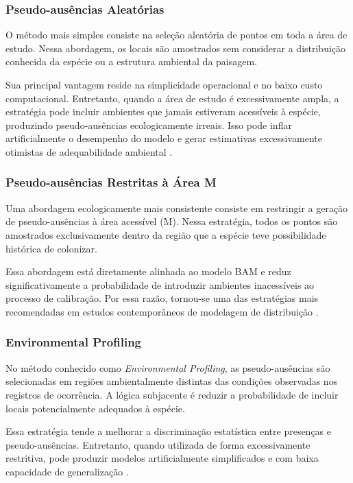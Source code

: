 \subsubsection{Pseudo-ausências Aleatórias}

O método mais simples consiste na seleção aleatória de pontos em toda a área de estudo. Nessa abordagem, os locais são amostrados sem considerar a distribuição conhecida da espécie ou a estrutura ambiental da paisagem.

Sua principal vantagem reside na simplicidade operacional e no baixo custo computacional. Entretanto, quando a área de estudo é excessivamente ampla, a estratégia pode incluir ambientes que jamais estiveram acessíveis à espécie, produzindo pseudo-ausências ecologicamente irreais. Isso pode inflar artificialmente o desempenho do modelo e gerar estimativas excessivamente otimistas de adequabilidade ambiental \citep{barve2011crucial}.

\subsubsection{Pseudo-ausências Restritas à Área M}

Uma abordagem ecologicamente mais consistente consiste em restringir a geração de pseudo-ausências à área acessível (M). Nessa estratégia, todos os pontos são amostrados exclusivamente dentro da região que a espécie teve possibilidade histórica de colonizar.

Essa abordagem está diretamente alinhada ao modelo BAM e reduz significativamente a probabilidade de introduzir ambientes inacessíveis ao processo de calibração. Por essa razão, tornou-se uma das estratégias mais recomendadas em estudos contemporâneos de modelagem de distribuição \citep{soberon2007grinnellian,barve2011crucial}.

\subsubsection{Environmental Profiling}

No método conhecido como \textit{Environmental Profiling}, as pseudo-ausências são selecionadas em regiões ambientalmente distintas das condições observadas nos registros de ocorrência. A lógica subjacente é reduzir a probabilidade de incluir locais potencialmente adequados à espécie.

Essa estratégia tende a melhorar a discriminação estatística entre presenças e pseudo-ausências. Entretanto, quando utilizada de forma excessivamente restritiva, pode produzir modelos artificialmente simplificados e com baixa capacidade de generalização \citep{barbet2012selecting}.

